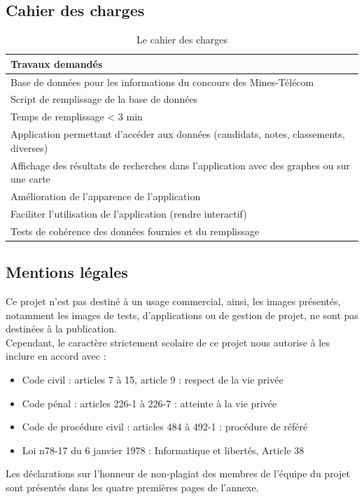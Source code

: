 \documentclass[12pt]{article}
\begin{document}
    \subsection*{Cahier des charges}
    \begin{table}[h]
        \centering
        \begin{tabular}{|l|}
            \hline
            \textbf{Travaux demandés}  \\
            \hline
            Base de données pour les informations du concours des Mines-Télécom \\
            Script de remplissage de la base de données \\
            Temps de remplissage < 3 min \\
            Application permettant d'accéder aux données (candidats, notes, classements, diverses) \\
            Affichage des résultats de recherches dans l'application avec des graphes ou sur une carte \\
            Amélioration de l'apparence de l'application \\
            Faciliter l'utilisation de l'application (rendre interactif) \\
            Tests de cohérence des données fournies et du remplissage \\
            \hline
        \end{tabular}
        \caption{Le cahier des charges}
        \label{tab:cdc}
    \end{table}

    \subsection*{Mentions légales}
        
    Ce projet n’est pas destiné à un usage commercial, ainsi, les images présentés, notamment les images de tests, d'applications ou de gestion de projet, ne sont pas destinées à la publication. \\
    Cependant, le caractère strictement scolaire de ce projet nous autorise à les inclure en accord avec :
    \begin{itemize}%
    \item Code civil : articles 7 à 15, article 9 : respect de la vie privée
    \item Code pénal : articles 226-1 à 226-7 : atteinte à la vie privée
    \item Code de procédure civil : articles 484 à 492-1 : procédure de référé
    \item Loi n78-17 du 6 janvier 1978 : Informatique et libertés, Article 38
    \end{itemize}
    Les déclarations sur l’honneur de non-plagiat des membres de l’équipe du projet sont présentés dans les quatre premières pages de l'annexe.
\end{document}
